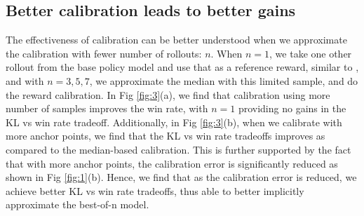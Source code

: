 \documentclass{article}
\begin{document}
\subsection{Better calibration leads to better gains}
The effectiveness of calibration can be better understood when we approximate the calibration with fewer number of rollouts: $n$. When $n=1$, we take one other rollout from the base policy model and use that as a reference reward, similar to \cite{wang2024transforming}, and with $n=3,5,7$, we approximate the median with this limited sample, and do the reward calibration. In Fig \ref{fig:3}(a), we find that calibration using more number of samples improves the win rate, with $n=1$ providing no gains in the KL vs win rate tradeoff. Additionally, in Fig \ref{fig:3}(b), when we calibrate with more anchor points, we find that the KL vs win rate tradeoffs improves as compared to the median-based calibration. This is further supported by the fact that with more anchor points, the calibration error is significantly reduced as shown in Fig \ref{fig:1}(b). Hence, we find that as the calibration error is reduced, we achieve better KL vs win rate tradeoffs, thus able to better implicitly approximate the best-of-n model. 

%
%
%
%
%
%
%
%
%
%

%
\end{document}

